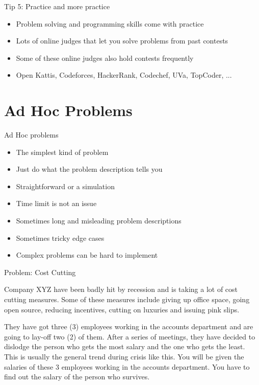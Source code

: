 \documentclass[10pt]{beamer}
\newcommand{\bi}{\begin{itemize}}
\newcommand{\ei}{\end{itemize}}
\begin{document}
\begin{frame}{Tip 5: Practice and more practice}
    \bi
        \item Problem solving and programming skills come with practice
        \item Lots of online judges that let you solve problems from past contests
        \item Some of these online judges also hold contests frequently
        \item Open Kattis, Codeforces, HackerRank, Codechef, UVa, TopCoder, ...
    \ei
\end{frame}


\section{Ad Hoc Problems}

\begin{frame}{Ad Hoc problems}
    \bi
        \item The simplest kind of problem
        \item Just do what the problem description tells you
        \item Straightforward or a simulation
        \item Time limit is not an issue
        \item Sometimes long and misleading problem descriptions
        \item Sometimes tricky edge cases
        \item Complex problems can be hard to implement
    \ei
\end{frame}

\begin{frame}{Problem: Cost Cutting}
    \vspace{10pt}
{
    \small
Company XYZ have been badly hit by recession and is taking a lot of cost cutting measures. Some of these measures include giving up office space, going open source, reducing incentives, cutting on luxuries and issuing pink slips.

\vspace{10pt}

They have got three (3) employees working in the accounts department and are going to lay-off two (2) of them. After a series of meetings, they have decided to dislodge the person who gets the most salary and the one who gets the least. This is usually the general trend during crisis like this.
You will be given the salaries of these 3 employees working in the accounts department. You have to find out the salary of the person who survives.
}
\end{frame}
\end{document}
